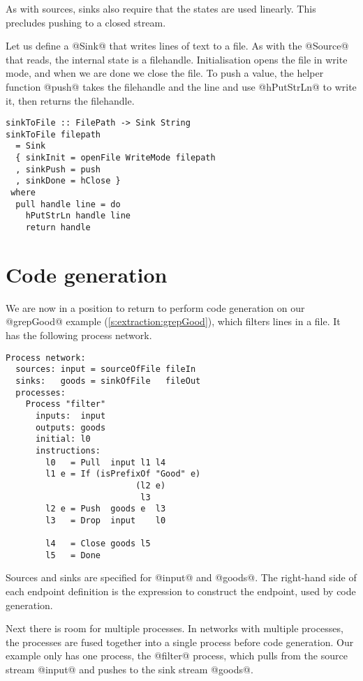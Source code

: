 As with sources, sinks also require that the states are used linearly.
This precludes pushing to a closed stream.

Let us define a @Sink@ that writes lines of text to a file.
As with the @Source@ that reads, the internal state is a filehandle.
Initialisation opens the file in write mode, and when we are done we close the file.
To push a value, the helper function @push@ takes the filehandle and the line and use @hPutStrLn@ to write it, then returns the filehandle.

\begin{lstlisting}
sinkToFile :: FilePath -> Sink String
sinkToFile filepath
  = Sink
  { sinkInit = openFile WriteMode filepath
  , sinkPush = push
  , sinkDone = hClose }
 where
  pull handle line = do
    hPutStrLn handle line
    return handle
\end{lstlisting}


\section{Code generation}
We are now in a position to return to perform code generation on our @grepGood@ example (\autoref{s:extraction:grepGood}), which filters lines in a file.
It has the following process network.

\begin{lstlisting}
Process network:
  sources: input = sourceOfFile fileIn
  sinks:   goods = sinkOfFile   fileOut
  processes:
    Process "filter"
      inputs:  input
      outputs: goods
      initial: l0
      instructions:
        l0   = Pull  input l1 l4
        l1 e = If (isPrefixOf "Good" e)
                          (l2 e)
                           l3
        l2 e = Push  goods e  l3
        l3   = Drop  input    l0

        l4   = Close goods l5
        l5   = Done
\end{lstlisting}

Sources and sinks are specified for @input@ and @goods@.
The right-hand side of each endpoint definition is the expression to construct the endpoint, used by code generation.

Next there is room for multiple processes.
In networks with multiple processes, the processes are fused together into a single process before code generation.
Our example only has one process, the @filter@ process, which pulls from the source stream @input@ and pushes to the sink stream @goods@.

